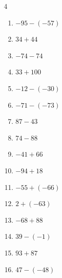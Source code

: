 \begin{multicols}{4}
\begin{enumerate}
  \item $-95-(-57)$

        \phantom{$=-38$}

  \item $34+44$

        \phantom{$=78$}

  \item $-74-74$

        \phantom{$=-148$}

  \item $33+100$

        \phantom{$=133$}

  \item $-12-(-30)$

        \phantom{$=18$}

  \item $-71-(-73)$

        \phantom{$=2$}

  \item $87-43$

        \phantom{$=44$}

  \item $74-88$

        \phantom{$=-14$}

  \item $-41+66$

        \phantom{$=25$}

  \item $-94+18$

        \phantom{$=-76$}

  \item $-55+(-66)$

        \phantom{$=-121$}

  \item $2+(-63)$

        \phantom{$=-61$}

  \item $-68+88$

        \phantom{$=20$}

  \item $39-(-1)$

        \phantom{$=40$}

  \item $93+87$

        \phantom{$=180$}

  \item $47-(-48)$

        \phantom{$=95$}


\end{enumerate}
\end{multicols}
